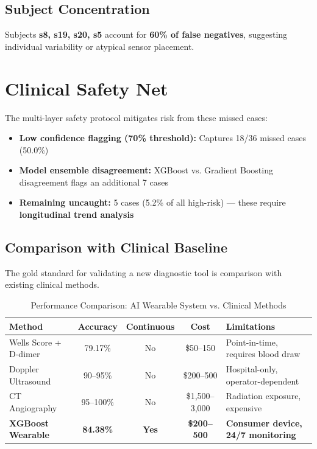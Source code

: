 \documentclass[3p,times,procedia]{elsarticle}
\begin{document}
\subsection*{Subject Concentration}
Subjects \textbf{s8, s19, s20, s5} account for \textbf{60\% of false negatives}, suggesting individual variability or atypical sensor placement.

\section*{Clinical Safety Net}

The multi-layer safety protocol mitigates risk from these missed cases:

\begin{itemize}
    \item \textbf{Low confidence flagging (70\% threshold):} Captures 18/36 missed cases (50.0\%)
    \item \textbf{Model ensemble disagreement:} XGBoost vs. Gradient Boosting disagreement flags an additional 7 cases
    \item \textbf{Remaining uncaught:} 5 cases (5.2\% of all high-risk) --- these require \textbf{longitudinal trend analysis}
\end{itemize}

\subsection{Comparison with Clinical Baseline}
The gold standard for validating a new diagnostic tool is comparison with existing clinical methods.

\FloatBarrier
\vspace{10pt}

\begin{table}[!ht]
\centering
\caption{Performance Comparison: AI Wearable System vs. Clinical Methods}
\small
\begin{tabular}{|l|c|c|c|l|}
\hline
\rowcolor{gray!20}
\textbf{Method} & \textbf{Accuracy} & \textbf{Continuous} & \textbf{Cost} & \textbf{Limitations} \\
\hline
Wells Score + D-dimer \cite{wells1997value} & 79.17\% & No & \$50--150 & Point-in-time, requires blood draw \\
\rowcolor{gray!10}
Doppler Ultrasound & 90--95\% & No & \$200--500 & Hospital-only, operator-dependent \\
CT Angiography & 95--100\% & No & \$1,500--3,000 & Radiation exposure, expensive \\
\hline
\rowcolor{gray!20}
\textbf{XGBoost Wearable} & \textbf{84.38\%} & \textbf{Yes} & \textbf{\$200--500} & \textbf{Consumer device, 24/7 monitoring} \\
\hline
\end{tabular}
\end{table}
\end{document}
